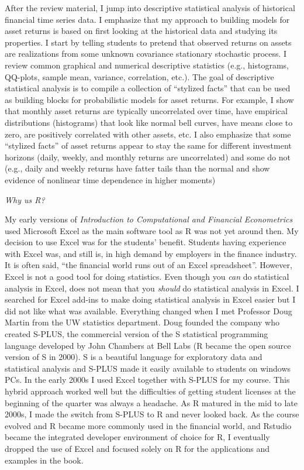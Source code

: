 \documentclass[
  letterpaper,
  DIV=11,
  numbers=noendperiod]{scrreprt}
\theoremstyle{definition}
\theoremstyle{definition}
\theoremstyle{remark}
\begin{document}
After the review material, I jump into descriptive statistical analysis
of historical financial time series data. I emphasize that my approach
to building models for asset returns is based on first looking at the
historical data and studying its properties. I start by telling students
to pretend that observed returns on assets are realizations from some
unknown covariance stationary stochastic process. I review common
graphical and numerical descriptive statistics (e.g., histograms,
QQ-plots, sample mean, variance, correlation, etc.). The goal of
descriptive statistical analysis is to compile a collection of
``stylized facts'' that can be used as building blocks for probabilistic
models for asset returns. For example, I show that monthly asset returns
are typically uncorrelated over time, have empirical distributions
(histograms) that look like normal bell curves, have means close to
zero, are positively correlated with other assets, etc. I also emphasize
that some ``stylized facts'' of asset returns appear to stay the same
for different investment horizons (daily, weekly, and monthly returns
are uncorrelated) and some do not (e.g., daily and weekly returns have
fatter tails than the normal and show evidence of nonlinear time
dependence in higher moments)

\emph{Why us R?}

My early versions of \emph{Introduction to Computational and Financial
Econometrics} used Microsoft Excel as the main software tool as R was
not yet around then. My decision to use Excel was for the students'
benefit. Students having experience with Excel was, and still is, in
high demand by employers in the finance industry. It is often said,
``the financial world runs out of an Excel spreadsheet''. However, Excel
is not a good tool for doing statistics. Even though you \emph{can} do
statistical analysis in Excel, does not mean that you \emph{should} do
statistical analysis in Excel. I searched for Excel add-ins to make
doing statistical analysis in Excel easier but I did not like what was
available. Everything changed when I met Professor Doug Martin from the
UW statistics department. Doug founded the company who created S-PLUS,
the commercial version of the S statistical programming language
developed by John Chambers at Bell Labs (R became the open source
version of S in 2000). S is a beautiful language for exploratory data
and statistical analysis and S-PLUS made it easily available to students
on windows PCs. In the early 2000s I used Excel together with S-PLUS for
my course. This hybrid approach worked well but the difficulties of
getting student licenses at the beginning of the quarter was always a
headache. As R matured in the mid to late 2000s, I made the switch from
S-PLUS to R and never looked back. As the course evolved and R became
more commonly used in the financial world, and Rstudio became the
integrated developer environment of choice for R, I eventually dropped
the use of Excel and focused solely on R for the applications and
examples in the book.
\end{document}
